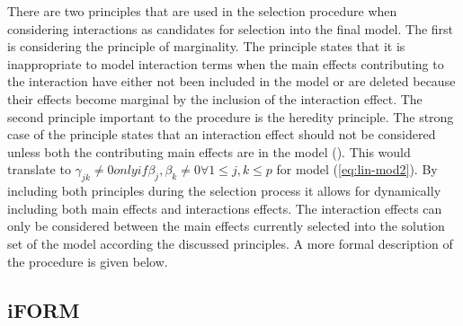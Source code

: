 \documentclass[11pt,]{book}
\theoremstyle{definition}
\theoremstyle{definition}
\theoremstyle{remark}
\begin{document}
There are two principles that are used in the selection procedure when
considering interactions as candidates for selection into the final
model. The first is considering the principle of marginality. The
principle states that it is inappropriate to model interaction terms
when the main effects contributing to the interaction have either not
been included in the model or are deleted because their effects become
marginal by the inclusion of the interaction effect. The second
principle important to the procedure is the heredity principle. The
strong case of the principle states that an interaction effect should
not be considered unless both the contributing main effects are in the
model (\cite{zhao2006model}). This would translate to
\(\gamma_{jk} ≠ 0 only if \beta_j, \beta_k \ne 0 \forall 1 ≤ j, k ≤ p\)
for model (\eqref{eq:lin-mod2}). By including both principles during the
selection process it allows for dynamically including both main effects
and interactions effects. The interaction effects can only be considered
between the main effects currently selected into the solution set of the
model according the discussed principles. A more formal description of
the procedure is given below.

\subsection{iFORM}\label{iform}
\end{document}
